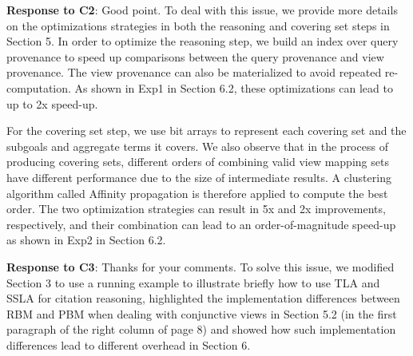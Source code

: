 \begin{appendix}


\textbf{Response to C2}:
Good point. To deal with this issue, we provide more details on the optimizations strategies in both the reasoning  and covering set steps in Section 5. In order to optimize the reasoning step, we build an index over query provenance to speed up comparisons between the query provenance and view provenance. The view provenance can also be materialized to avoid repeated re-computation. As shown in Exp1 in Section 6.2, these optimizations can lead to up to 2x speed-up. 

For the covering set step, we use bit arrays to represent each covering set and the subgoals and aggregate terms it covers. We also observe that in the process of producing covering sets, different orders of combining valid view mapping sets have different performance due to the size of intermediate results. A clustering algorithm called Affinity propagation is therefore applied to compute the best order. The two optimization strategies can result in 5x and 2x improvements, respectively, and their combination can lead to an order-of-magnitude speed-up as shown in Exp2 in Section 6.2. 

\textbf{Response to C3}:
Thanks for your comments. To solve this issue, we modified Section 3 to use a running example to illustrate briefly how to use TLA and SSLA for citation reasoning, highlighted the implementation differences between RBM and PBM when dealing with conjunctive views in Section 5.2 (in the first paragraph of the right column of page 8) and showed how such implementation differences lead to different overhead in Section 6.  


\end{appendix}

